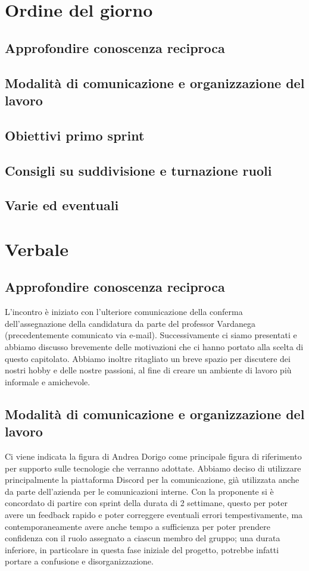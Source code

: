\documentclass[italian,12pt]{article}
\begin{document}
\section{Ordine del giorno}
\subsection{Approfondire conoscenza reciproca}
\subsection{Modalità di comunicazione e organizzazione del lavoro}
\subsection{Obiettivi primo sprint}
\subsection{Consigli su suddivisione e turnazione ruoli}
\subsection{Varie ed eventuali}

\newpage

\section{Verbale}

\subsection{Approfondire conoscenza reciproca}
L'incontro è iniziato con l'ulteriore comunicazione della conferma dell'assegnazione della candidatura da parte del professor Vardanega (precedentemente comunicato via e-mail). Successivamente ci siamo presentati e abbiamo discusso brevemente delle motivazioni che ci hanno portato alla scelta di questo capitolato. Abbiamo inoltre ritagliato un breve spazio per discutere dei nostri hobby e delle nostre passioni, al fine di creare un ambiente di lavoro più informale e amichevole.

\subsection{Modalità di comunicazione e organizzazione del lavoro}
Ci viene indicata la figura di Andrea Dorigo come principale figura di riferimento per supporto sulle tecnologie che verranno adottate. Abbiamo deciso di utilizzare principalmente la piattaforma Discord per la comunicazione, già utilizzata anche da parte dell'azienda per le comunicazioni interne. Con la proponente si è concordato di partire con sprint della durata di 2 settimane, questo per poter avere un feedback rapido e poter correggere eventuali errori tempestivamente, ma contemporaneamente avere anche tempo a sufficienza per poter prendere confidenza con il ruolo assegnato a ciascun membro del gruppo; una durata inferiore, in particolare in questa fase iniziale del progetto, potrebbe infatti portare a confusione e disorganizzazione.
\end{document}
